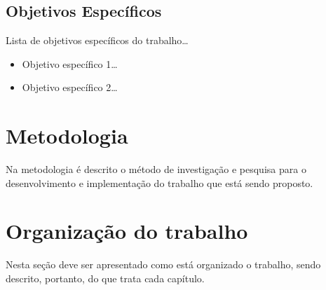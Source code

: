 \subsection{Objetivos Específicos} 

Lista de objetivos específicos do trabalho\ldots

\begin{itemize}
  \item Objetivo específico 1\ldots
  \item Objetivo específico 2\ldots  
\end{itemize}

\section{Metodologia}

Na metodologia é descrito o método de investigação e pesquisa para o
desenvolvimento e implementação do trabalho que está sendo proposto.

\section{Organização do trabalho}

Nesta seção deve ser apresentado como está organizado o trabalho, sendo
descrito, portanto, do que trata cada capítulo.
